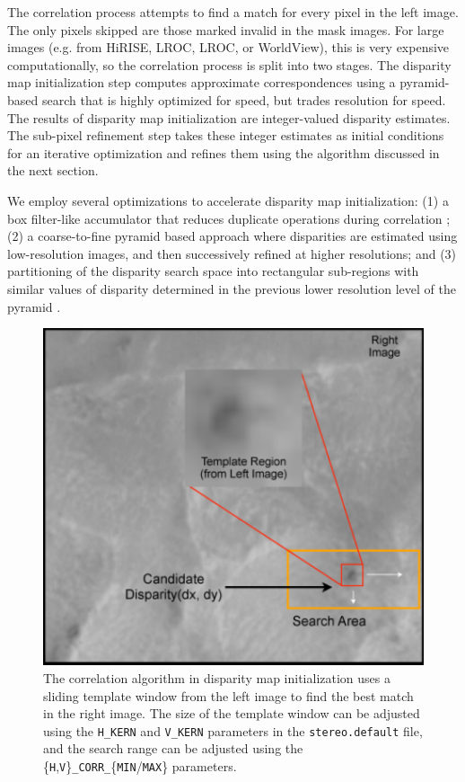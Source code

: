 The correlation process attempts to find a match for every pixel in
the left image. The only pixels skipped are those marked invalid in
the mask images. For large images (e.g. from \ac{HiRISE}, \acl{LROC},
\acs{LROC}, or WorldView), this is very expensive computationally, so
the correlation process is split into two stages.  The disparity map
initialization step computes approximate correspondences using a
pyramid-based search that is highly optimized for speed, but trades
resolution for speed. The results of disparity map initialization are
integer-valued disparity estimates.  The sub-pixel refinement step
takes these integer estimates as initial conditions for an iterative
optimization and refines them using the algorithm discussed in the
next section.

We employ several optimizations to accelerate disparity map
initialization: (1) a box filter-like accumulator that reduces
duplicate operations during correlation \citep{Sun02rectangular}; (2) a
coarse-to-fine pyramid based approach where disparities are estimated
using low-resolution images, and then successively refined at higher
resolutions; and (3) partitioning of the disparity search space into
rectangular sub-regions with similar values of disparity determined in
the previous lower resolution level of the
pyramid \citep{Sun02rectangular}.

\begin{figure}[bt]
  \centering
  \includegraphics[width=13cm]{images/correlation/correlation_400px.png}
  \caption{The correlation algorithm in disparity map initialization
    uses a sliding template window from the left image to find the
    best match in the right image.  The size of the template window
    can be adjusted using the \texttt{H\_KERN} and \texttt{V\_KERN} parameters in the
    \texttt{stereo.default} file, and the search range can be adjusted
    using the \{\texttt{H},\texttt{V}\}\texttt{\_CORR\_}\{\texttt{MIN}/\texttt{MAX}\} parameters.}
  \label{fig:correlation_window}
\end{figure}

